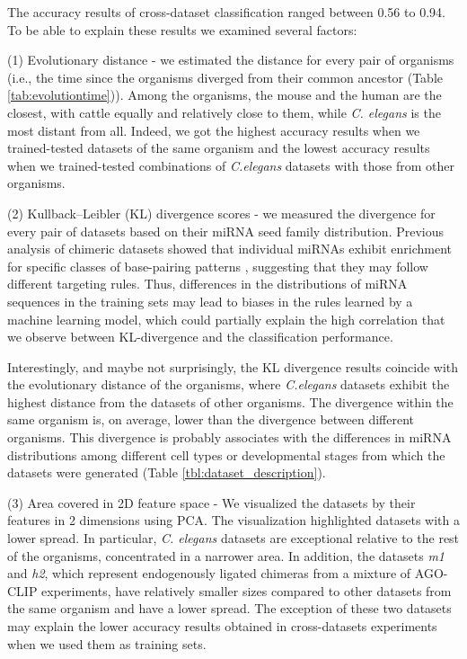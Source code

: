 The accuracy results of cross-dataset classification ranged between 0.56 to 0.94. To be able to explain these results we examined several factors:

(1) Evolutionary distance - we estimated the distance for every pair of organisms (i.e., the time since the organisms diverged from their common ancestor (Table \ref{tab:evolutiontime})). Among the organisms, the mouse and the human are the closest, with cattle equally and relatively close to them, while \textit{C. elegans} is the most distant from all. Indeed, we got the highest accuracy results when we trained-tested datasets of the same organism and the lowest accuracy results when we trained-tested combinations of \textit{C.elegans} datasets with those from other organisms.

(2) Kullback–Leibler (KL) divergence scores -  we measured the divergence for every pair of datasets based on their miRNA seed family distribution. Previous analysis of chimeric datasets showed that individual miRNAs exhibit enrichment for specific classes of base-pairing patterns \cite{helwak2013mapping, broughton2016pairing}, suggesting that they may follow different targeting rules.
Thus, differences in the distributions of miRNA sequences in the training sets may lead to biases in the rules learned by a machine learning model, which could partially explain the high correlation that we observe between KL-divergence and the classification performance.  

Interestingly, and maybe not surprisingly, the KL divergence results coincide with the evolutionary distance of the organisms, where \textit{C.elegans} datasets exhibit the highest distance from the datasets of other organisms. The divergence within the same organism is, on average, lower than the divergence between different organisms. This divergence is probably associates with the differences in miRNA distributions among different cell types or developmental stages from which the datasets were generated (Table \ref{tbl:dataset_description}). 

(3) Area covered in 2D feature space - We visualized the datasets by their features in 2 dimensions using PCA. The visualization highlighted datasets with a lower spread. In particular, \textit{C. elegans} datasets are exceptional relative to the rest of the organisms, concentrated in a narrower area. In addition, the datasets \textit{m1} and \textit{h2}, which represent endogenously ligated chimeras from a mixture of AGO-CLIP experiments, have relatively smaller sizes compared to other datasets from the same organism and have a lower spread. The exception of these two datasets may explain the lower accuracy results obtained in cross-datasets experiments when we used them as training sets.


